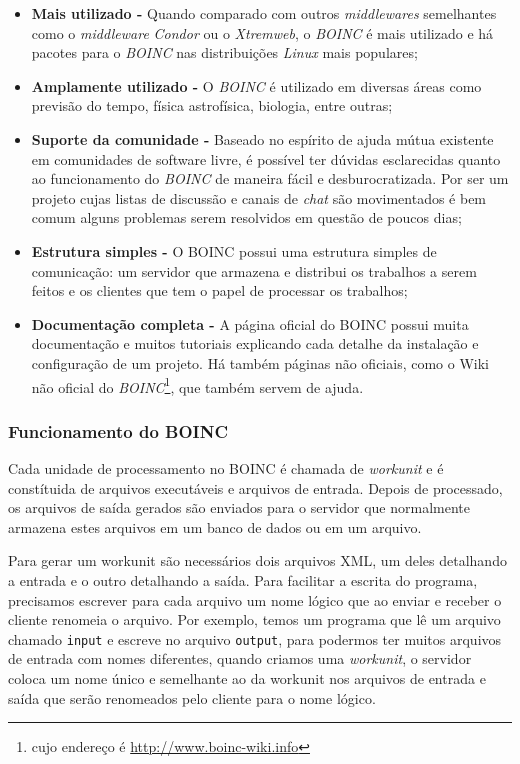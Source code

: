 \begin{itemize}
  \item \textbf{Mais utilizado -} Quando comparado com outros \emph{middlewares} semelhantes como o \textit{middleware} 
\emph{Condor} ou o \emph{Xtremweb}, o \emph{BOINC} é mais utilizado e há pacotes para o \emph{BOINC} nas 
distribuições \emph{Linux} mais populares;
  \item \textbf{Amplamente utilizado -} O \emph{BOINC} é utilizado em diversas áreas como previsão do tempo, física
astrofísica, biologia, entre outras;
  \item \textbf{Suporte da comunidade -} Baseado no espírito de ajuda mútua existente em comunidades de software livre, é 
possível ter dúvidas esclarecidas quanto ao funcionamento do \emph{BOINC} de maneira fácil e desburocratizada. Por ser um projeto
cujas listas de discussão e canais de \textit{chat} são movimentados é bem comum alguns problemas serem resolvidos em questão de 
poucos dias;
  \item \textbf{Estrutura simples -} O BOINC possui uma estrutura simples de comunicação: um servidor que armazena e 
distribui os trabalhos a serem feitos e os clientes que tem o papel de processar os trabalhos;
  \item \textbf{Documentação completa -} A página oficial do BOINC possui muita documentação e muitos tutoriais explicando
cada detalhe da instalação e configuração de um projeto. Há também páginas não oficiais, como o Wiki não oficial do \emph{BOINC}\footnote{cujo endereço é \url{http://www.boinc-wiki.info}},
que também servem de ajuda.
\end{itemize}



\subsubsection{Funcionamento do BOINC}


Cada unidade de processamento no BOINC é chamada de \emph{workunit} e é constítuida de arquivos executáveis e 
arquivos de entrada. Depois de processado, os arquivos de saída gerados são enviados para o servidor que
normalmente armazena estes arquivos em um banco de dados ou em um arquivo.

Para gerar um workunit são necessários dois arquivos XML, um deles detalhando a entrada e o 
outro detalhando a saída. Para facilitar a escrita do programa, precisamos escrever para cada arquivo um nome lógico 
que ao enviar e receber o cliente renomeia o arquivo. Por exemplo, temos um programa que lê um arquivo chamado 
\verb#input# e escreve no arquivo \verb#output#, para podermos ter muitos arquivos de entrada com nomes diferentes, quando
criamos uma \emph{workunit}, o servidor coloca um nome único e semelhante ao da workunit nos arquivos de entrada e saída que serão renomeados
pelo cliente para o nome lógico.

